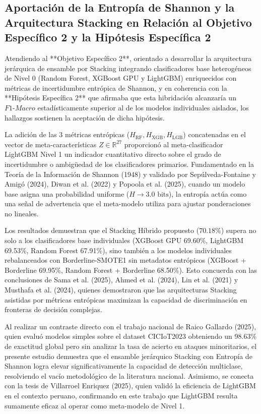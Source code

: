 \subsection{Aportación de la Entropía de Shannon y la Arquitectura Stacking en Relación al Objetivo Específico 2 y la Hipótesis Específica 2}

Atendiendo al **Objetivo Específico 2**, orientado a desarrollar la arquitectura jerárquica de ensamble por Stacking integrando clasificadores base heterogéneos de Nivel 0 (Random Forest, XGBoost GPU y LightGBM) enriquecidos con métricas de incertidumbre entrópica de Shannon, y en coherencia con la **Hipótesis Específica 2** que afirmaba que esta hibridación alcanzaría un $F1\text{-}Macro$ estadísticamente superior al de los modelos individuales aislados, los hallazgos sostienen la aceptación de dicha hipótesis.

La adición de las 3 métricas entrópicas ($H_{\mathrm{RF}}, H_{\mathrm{XGB}}, H_{\mathrm{LGB}}$) concatenadas en el vector de meta-características $Z \in \mathbb{R}^{27}$ proporcionó al meta-clasificador LightGBM Nivel 1 un indicador cuantitativo directo sobre el grado de incertidumbre o ambigüedad de los clasificadores primarios. Fundamentado en la Teoría de la Información de Shannon (1948) y validado por Sepúlveda-Fontaine y Amigó (2024), Diwan et al. (2022) y Popoola et al. (2025), cuando un modelo base asigna una probabilidad uniforme ($H \to 3.0\text{ bits}$), la entropía actúa como una señal de advertencia que el meta-modelo utiliza para ajustar ponderaciones no lineales.

Los resultados demuestran que el Stacking Híbrido propuesto ($70.18\%$) supera no solo a los clasificadores base individuales (XGBoost GPU 69.60\%, LightGBM 69.53\%, Random Forest 67.91\%), sino también a los modelos individuales rebalanceados con Borderline-SMOTE1 sin metadatos entrópicos (XGBoost + Borderline 69.95\%, Random Forest + Borderline 68.50\%). Esto concuerda con las conclusiones de Sama et al. (2025), Ahmed et al. (2024), Lin et al. (2021) y Musthafa et al. (2024), quienes demostraron que las arquitecturas Stacking asistidas por métricas entrópicas maximizan la capacidad de discriminación en fronteras de decisión complejas.

Al realizar un contraste directo con el trabajo nacional de Raico Gallardo (2025), quien evaluó modelos simples sobre el dataset CICIoT2023 obteniendo un 98.63\% de exactitud global pero sin analizar la tasa de acierto en ataques minoritarios, el presente estudio demuestra que el ensamble jerárquico Stacking con Entropía de Shannon logra elevar significativamente la capacidad de detección multiclase, resolviendo el vacío metodológico de la literatura nacional. Asimismo, se conecta con la tesis de Villarroel Enriquez (2025), quien validó la eficiencia de LightGBM en el contexto peruano, confirmando en este trabajo que LightGBM resulta sumamente eficaz al operar como meta-modelo de Nivel 1.

